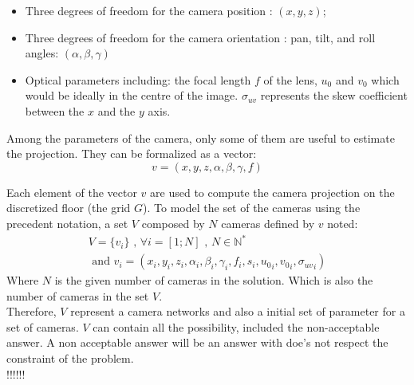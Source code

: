 \begin{itemize}
\item Three degrees of freedom for the camera position : $(x, y, z)$;
\item Three degrees of freedom for the camera orientation : pan, tilt, and roll angles: $(\alpha,\beta, \gamma)$ 
\item Optical parameters including: the focal length $f$ of the lens, %
 $u_{0}$ and $v_0 $  which would be ideally in the centre of the image. $\sigma_{uv}$ represents the skew coefficient between the $x$ and the $y$ axis.
\end{itemize}

Among the parameters of the camera, only  some of them are useful to estimate the projection. They can be formalized as a vector:
\begin{equation}\label{eq:v}
v=(x,y,z,\alpha ,\beta,\gamma,f)%
\end{equation}

Each element of the vector $v$ are used to compute the camera projection on the discretized floor (the grid $G$). 
\iffalse 
To model the set of the cameras using the precedent notation, a set $V$ composed by $N$ cameras defined by $v$ noted:
\begin{equation}\label{eq:V}
\begin{split}
V= \{v_i\} \mbox{  , } \forall i=[1;N] \mbox{ , } N\in \mathbb{N}^*
\\
\mbox{ and } v_i= (x_i,y_i,z_i,\alpha_i ,\beta_i,\gamma_i,f_i,s_i,{u_0}_i,{v_0}_i,{\sigma_{uv}}_i)
\end{split}
\end{equation}
\noindent Where $N$ is the given number of cameras in the solution. Which is also the number of cameras in the set $V$. \\
Therefore, $V$ represent a camera networks and also a initial set of parameter for a set of cameras. $V$ can contain all the possibility, included the non-acceptable answer. A non acceptable  answer will be an answer with  doe's not respect the constraint of the problem.   
 \\ !!!!!!\\

